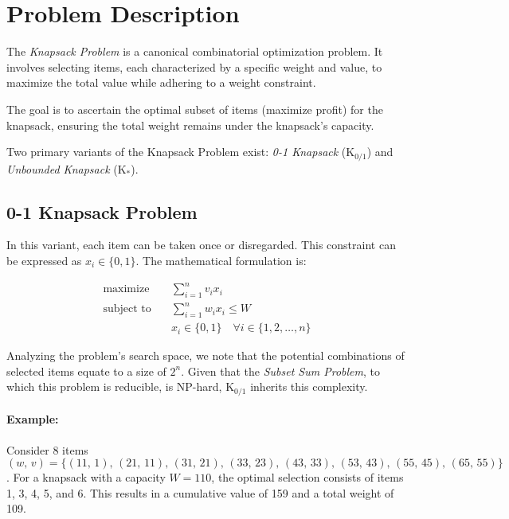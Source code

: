 \section{Problem Description}
\label{sec:knapsack:probl}
  The \emph{Knapsack Problem} is a canonical combinatorial optimization problem. 
  It involves selecting items, each characterized by a specific weight and 
  value, to maximize the total value while adhering to a weight constraint. 

  The goal is to ascertain the optimal subset of items (maximize profit) for the 
  knapsack, ensuring the total weight remains under the knapsack's capacity.

  Two primary variants of the Knapsack Problem exist: \emph{0-1 Knapsack}
  (\(\mathrm{K_{0 / 1}}\)) and \emph{Unbounded Knapsack} (\(\mathrm{K_{*}}\)).

  \subsection{0-1 Knapsack Problem}
    In this variant, each item can be taken once or disregarded.
    This constraint can be expressed as \(x_i \in \{0, 1\}\).
    The mathematical formulation is:

    \begin{equation}
      \label{eq:knapsack:01}
      \begin{aligned}
        \text{maximize} \quad & \sum_{i=1}^{n} v_i x_i \\
        \text{subject to} \quad & \sum_{i=1}^{n} w_i x_i \leq W \\
          & x_i \in \{0, 1\} \quad \forall i \in \{1, 2, \dots, n\}
      \end{aligned}
    \end{equation}

    Analyzing the problem's search space, we note that the potential 
    combinations of selected items equate to a size of \(2^n\).
    Given that the \emph{Subset Sum Problem}, to which this problem is 
    reducible, is NP-hard, \(\mathrm{K}_{0/1}\) inherits this complexity.

    \paragraph{Example:}
      Consider 8 items \((w,\, v) = \{(11,\, 1),\, (21,\, 11),\, (31,\, 21),\, 
      (33,\, 23),\, (43,\, 33),\, (53,\, 43),\, (55,\, 45),\, (65,\, 55)\}\). For a knapsack with a 
      capacity \(W = 110\), the optimal selection consists of items 1, 3, 4, 5, 
      and 6.
      This results in a cumulative value of 159 and a total weight of 109.


